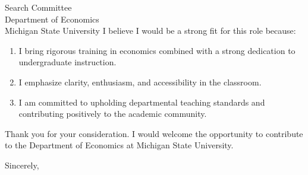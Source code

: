 \documentclass[11pt,letterpaper]{letter}
\begin{document}
\begin{letter}{
Search Committee \\
Department of Economics \\
Michigan State University
}
I believe I would be a strong fit for this role because:
\begin{enumerate}
    \item I bring rigorous training in economics combined with a strong dedication to undergraduate instruction.
    \item I emphasize clarity, enthusiasm, and accessibility in the classroom.
    \item I am committed to upholding departmental teaching standards and contributing positively to the academic community.
\end{enumerate}

Thank you for your consideration. I would welcome the opportunity to contribute to the Department of Economics at Michigan State University.

\closing{Sincerely,}

\end{letter}
\end{document}
